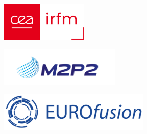 \begin{center}
	\begin{minipage}[c]{.25\linewidth} 
		\centering\includegraphics[height=5em]{logo/logo_IRFM.jpg}
	\end{minipage}\hspace{0.05\linewidth} 
	\begin{minipage}[c]{.25\linewidth} 
		\centering\includegraphics[height=5em]{logo/logo_M2P2.png}
	\end{minipage}\hspace{0.05\linewidth}
	\begin{minipage}[c]{.35\linewidth} 
		\centering\includegraphics[height=5em]{logo/logo_eurofusion.png}
	\end{minipage}
\end{center}

\restoregeometry
